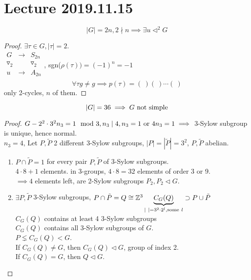 \documentclass{article}
\let\ddd\cdots
\newcommand{\Z}{\mathbb{Z}}
\newcommand{\abs}[1]{\left|#1\right|}
\theoremstyle{definition}
\theoremstyle{remark}
\theoremstyle{example}
\begin{document}
	\section*{Lecture 2019.11.15}
	\[\abs{G} = 2n, 2 \nmid n \implies \exists u \triangleleft^2 G \]
	
	\begin{proof}
		$\exists \tau \in G, \abs{\tau} =2$.\\
		
		$\begin{matrix}
		G & \to & S_{2n}\\
		\triangledown_2 & & \triangledown_2\\
		u & \to & A_{2n}\\
		\end{matrix}$,%
		sgn($\rho(\tau))=(-1)^n=-1$\\
		\[ \forall \tau g \neq g \implies p(\tau) = (\ )(\ ) \ddd (\ )\] only 2-cycles, $n$ of them.
	\end{proof}

	\[\abs{G}=36 \implies \notag G\ \mathrm{not\ simple}\]
	\begin{proof}
		$G-2^2\cdot 3^2\\
		n_3=1 \mod 3, n_3 \mid 4, n_3=1 \mathrm{\ or\ } 4\\
		n_3 = 1 \implies $ 3-Sylow subgroup is unique, hence normal.\\
		$n_3=4$, Let $P, \tilde{P}$ 2 different 3-Sylow subgroups, $\abs{P}=\abs{\tilde{P}}=3^2$, $P,\tilde{P}$ abelian.\\
		\begin{enumerate}
			\item $P \cap \tilde{P}=1$ for every pair $P, \tilde{P}$ of 3-Sylow subgroups.\\
			$4 \cdot 8 + 1 $ elements. in 3-groups, $4 \cdot 8=32$ elements of order 3 or 9.\\
			$\implies 4$ elements left, are 2-Sylow subgroups $P_2, P_2 \triangleleft G$.
			\item $\exists P,\tilde{P}$ 3-Sylow subgroups, $P \cap \tilde{P} =Q\cong \Z^3\\
			\underbrace{C_G(Q)}_{\abs{\ }=3^2 \cdot 2^l, \mathrm{some\ } l} \supset P \cup \tilde{P}$\\
			$C_G(Q)$ contains at least 4 3-Sylow subgroups\\
			$C_G(Q)$ contains all 3-Sylow subgroups of $G$.\\
			$P \lneq C_G(Q) < G$.\\
			If $C_G(Q) \neq G$, then $C_G(Q) \triangleleft G$, group of index 2.\\
			If $C_G(Q) = G$, then $Q \triangleleft G$.
		\end{enumerate}
	\end{proof}
\end{document}

